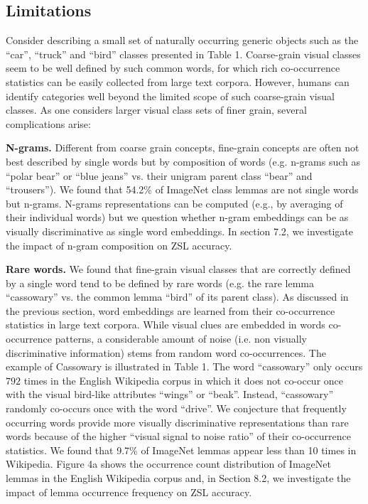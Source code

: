 \subsection{Limitations}

Consider describing a small set of naturally occurring generic objects such as the ``car'', ``truck'' and ``bird'' classes presented in Table 1. Coarse-grain visual classes seem to be well defined by such common words, for which rich co-occurrence statistics can be easily collected from large text corpora. However, humans can identify categories well beyond the limited scope of such coarse-grain visual classes. As one considers larger visual class sets of finer grain, several complications arise: 

\textbf{N-grams.} Different from coarse grain concepts, fine-grain concepts are often not best described by single words but by composition of words (e.g. n-grams such as ``polar bear'' or ``blue jeans'' vs. their unigram parent class ``bear'' and ``trousers''). We found that 54.2\% of ImageNet class lemmas are not single words but n-grams. N-grams representations can be computed (e.g., by averaging of their individual words) but we question whether n-gram embeddings can be as visually discriminative as single word embeddings. In section 7.2, we investigate the impact of n-gram composition on ZSL accuracy.

\textbf{Rare words.} We found that fine-grain visual classes that are correctly defined by a single word tend to be defined by rare words (e.g. the rare lemma ``cassowary'' vs. the common lemma ``bird'' of its parent class). As discussed in the previous section, word embeddings are learned from their co-occurrence statistics in large text corpora. While visual clues are embedded in words co-occurrence patterns, a considerable amount of noise (i.e. non visually discriminative information) stems from random word co-occurrences. The example of Cassowary is illustrated in Table 1. The word ``cassowary'' only occurs $792$ times in the English Wikipedia corpus in which it does not co-occur once with the visual bird-like attributes ``wings'' or ``beak''. Instead, ``cassowary'' randomly co-occurs once with the word ``drive''. We conjecture that frequently occurring words provide more visually discriminative representations than rare words because of the higher ``visual signal to noise ratio'' of their co-occurrence statistics. We found that 9.7\% of ImageNet lemmas appear less than 10 times in Wikipedia. Figure 4a shows the occurrence count distribution of ImageNet lemmas in the English Wikipedia corpus and, in Section 8.2, we investigate the impact of lemma occurrence frequency on ZSL accuracy.

